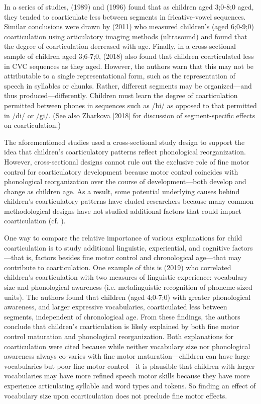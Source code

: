 \documentclass[a4paper,man,natbib,donotrepeattitle, apacite]{apa6}
\begin{document}
In a series of studies, \citeauthor{nittrouerEmergencePhoneticSegments1989} (1989) and \citeauthor{nittrouerHowChildrenLearn1996} (1996) found that as children aged 3;0-8;0 aged, they tended to coarticulate less between segments in fricative-vowel sequences. Similar conclusions were drawn by \citeauthor{zharkovaCoarticulationIndicatorSpeech2011} (2011) who measured children’s (aged 6;0-9;0) coarticulation using articulatory imaging methods (ultrasound) and found that the degree of coarticulation decreased with age. Finally, in a cross-sectional sample of children aged 3;6-7;0, \citeauthor{noirayHowChildrenOrganize2018} (2018) also found that children coarticulated less in CVC sequences as they aged. However, the authors warn that this may not be attributable to a single representational form, such as the representation of speech in syllables or chunks. Rather, different segments may be organized---and thus produced---differently. Children must learn the degree of coarticulation permitted between phones in sequences such as /bi/ as opposed to that permitted in /di/ or /gi/. (See also Zharkova [2018] for discussion of segment-specific effects on coarticulation.) 

The aforementioned studies used a cross-sectional study design to support the idea that children’s coarticulatory patterns reflect phonological reorganization. However, cross-sectional designs cannot rule out the exclusive role of fine motor control for coarticulatory development because motor control coincides with phonological reorganization over the course of development---both develop and change as children age. As a result, some potential underlying causes behind children’s coarticulatory patterns have eluded researchers because many common methodological designs have not studied additional factors that could impact coarticulation (cf. ).

One way to compare the relative importance of various explanations for child coarticulation is to study additional linguistic, experiential, and cognitive factors---that is, factors besides fine motor control and chronological age---that may contribute to coarticulation. One example of this is \citeauthor{noiraySpokenLanguageDevelopment2019} (2019) who correlated children’s coarticulation with two measures of linguistic experience: vocabulary size and phonological awareness (i.e. metalinguistic recognition of phoneme-sized units). The authors found that children (aged 4;0-7;0) with greater phonological awareness, and larger expressive vocabularies, coarticulated less between segments, independent of chronological age. From these findings, the authors conclude that children’s coarticulation is likely explained by both fine motor control maturation and phonological reorganization. Both explanations for coarticulation were cited because while neither vocabulary size nor phonological awareness always co-varies with fine motor maturation---children can have large vocabularies but poor fine motor control---it is plausible that children with larger vocabularies may have more refined speech motor skills because they have more experience articulating syllable and word types and tokens. So finding an effect of vocabulary size upon coarticulation does not preclude fine motor effects. 
\end{document}

